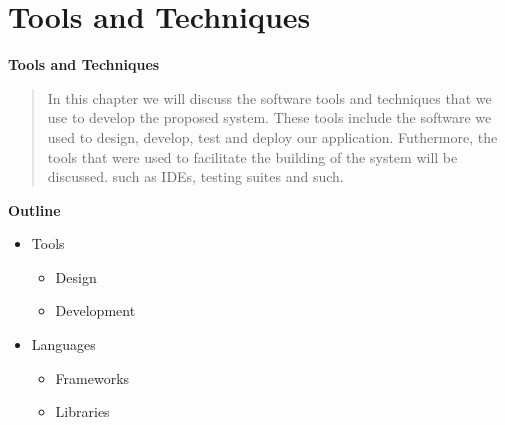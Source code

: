 
\section{Tools and Techniques}


\vspace{20mm}

\Huge{\textbf{Tools and Techniques}}

\vspace{20mm}




\begin{abstract}
    In this chapter we will discuss the software tools and techniques that we use to develop the proposed system. These tools include the software we used to design, develop, test and deploy our application. Futhermore, the tools that were used to facilitate the building of the system will be discussed. such as IDEs, testing suites and such.

\end{abstract}

\vspace{20mm}

\large{\textbf{Outline}}

\begin{center}
    \begin{itemize}
        \item Tools
              \begin{itemize}
                  \item Design
                  \item Development
              \end{itemize}
        \item Languages
              \begin{itemize}
                  \item Frameworks
                  \item Libraries
              \end{itemize}

    \end{itemize}
\end{center}
\pagebreak







